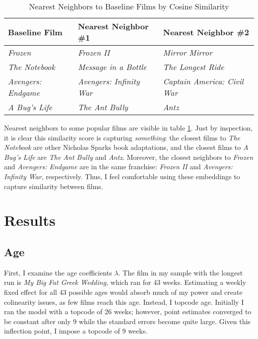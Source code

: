 \documentclass{article}
\begin{document}
\begin{table}[]
    \begin{center}
        \begin{tabular}{@{}lll@{}}
        \toprule
        \textbf{Baseline Film}    & \textbf{Nearest Neighbor \#1}   & \textbf{Nearest Neighbor \#2}       \\ \midrule
        \textit{Frozen}            & \textit{Frozen II}              & \textit{Mirror Mirror}              \\
        \textit{The Notebook}      & \textit{Message in a Bottle}    & \textit{The Longest Ride}           \\
        \textit{Avengers: Endgame} & \textit{Avengers: Infinity War} & \textit{Captain America: Civil War} \\
        \textit{A Bug's Life}      & \textit{The Ant Bully}          & \textit{Antz}                       \\ \bottomrule
        \end{tabular}
        \caption{Nearest Neighbors to Baseline Films by Cosine Similarity}
        \label{tab:cosine}
    \end{center}
\end{table}

Nearest neighbors to some popular films are visible in table \ref{tab:cosine}. Just by inspection, it is clear this similarity score is capturing \emph{something}: the closest films to \emph{The Notebook} are other Nicholas Sparks book adaptations, and the closest films to \emph{A Bug's Life} are \emph{The Ant Bully} and \emph{Antz}. Moreover, the closest neighbors to \emph{Frozen} and \emph{Avengers: Endgame} are in the same franchise: \emph{Frozen II} and \emph{Avengers: Infinity War}, respectively. Thus, I feel comfortable using these embeddings to capture similarity between films.

\section{Results}

\subsection{Age}

First, I examine the age coefficients $\lambda$. The film in my sample with the longest run is \emph{My Big Fat Greek Wedding,} which ran for 43 weeks. Estimating a weekly fixed effect for all 43 possible ages would absorb much of my power and create colinearity issues, as few films reach this age. Instead, I topcode age. Initially I ran the model with a topcode of 26 weeks; however, point estimates converged to be constant after only 9 while the standard errors become quite large. Given this inflection point, I impose a topcode of 9 weeks.
\end{document}
